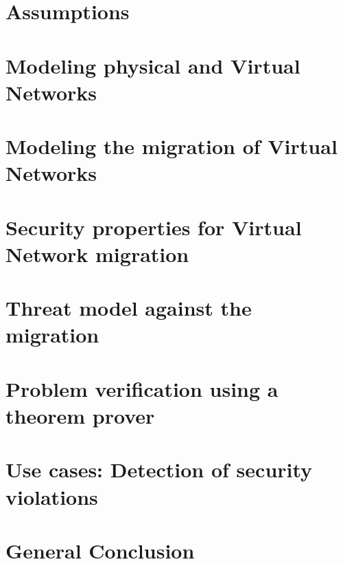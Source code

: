 \documentclass[a4paper, 11pt]{report}
\theoremstyle{definition}
\begin{document}
% 

\section{Assumptions}


\newpage
\section{Modeling physical and Virtual Networks}


\section{Modeling the migration of Virtual Networks}


\newpage
\section{Security properties for Virtual Network migration}




\section{Threat model against the migration}


\section{Problem verification using a theorem prover}


\section{Use cases: Detection of security violations}


\newpage
\section{General Conclusion}

\end{document}
